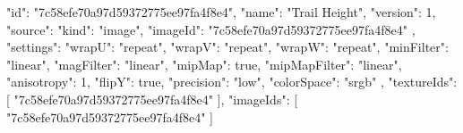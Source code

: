 {
  "id": "7c58efe70a97d59372775ee97fa4f8e4",
  "name": "Trail Height",
  "version": 1,
  "source": {
    "kind": "image",
    "imageId": "7c58efe70a97d59372775ee97fa4f8e4"
  },
  "settings": {
    "wrapU": "repeat",
    "wrapV": "repeat",
    "wrapW": "repeat",
    "minFilter": "linear",
    "magFilter": "linear",
    "mipMap": true,
    "mipMapFilter": "linear",
    "anisotropy": 1,
    "flipY": true,
    "precision": "low",
    "colorSpace": "srgb"
  },
  "textureIds": [
    "7c58efe70a97d59372775ee97fa4f8e4"
  ],
  "imageIds": [
    "7c58efe70a97d59372775ee97fa4f8e4"
  ]
}
